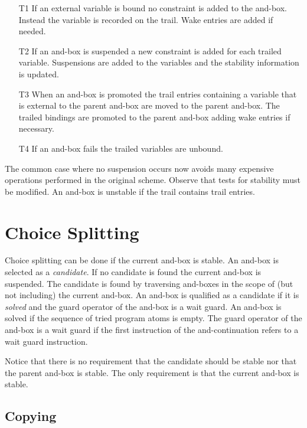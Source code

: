 \begin{itemize}

\item[T1] If an external variable is bound no constraint is added 
to the and-box. Instead the variable is recorded on the trail.
Wake entries are added if needed.

\item[T2] If an and-box is suspended a new constraint is added for 
each trailed variable. Suspensions are added to the variables and
the  stability information is updated.

\item[T3] When an and-box is promoted the trail entries containing a variable 
that is external to the parent and-box are moved to the parent and-box.
The trailed bindings are promoted to the parent and-box adding wake 
entries if necessary.

\item[T4] If an and-box fails the trailed variables are unbound.



\end{itemize}

The common case where no suspension occurs now avoids many expensive
operations performed in the original scheme. Observe that tests for
stability must be modified. An and-box is unstable if the trail contains
trail entries.

\section{Choice Splitting}

Choice splitting can be done if the current and-box is stable.  An
and-box is selected as a {\em candidate}. If no candidate is found the
current and-box is suspended. The candidate is found by traversing
and-boxes in the scope of (but not including) the current and-box. An
and-box is qualified as a candidate if it is {\em solved} and the
guard operator of the and-box is a wait guard. An and-box is solved if
the sequence of tried program atoms is empty. The guard operator of
the and-box is a wait guard if the first instruction of the
and-continuation refers to a wait guard instruction.

Notice that there is no requirement that the candidate should be 
stable nor that the parent and-box is stable. The only requirement is that
the current and-box is stable.


\subsection*{Copying}

